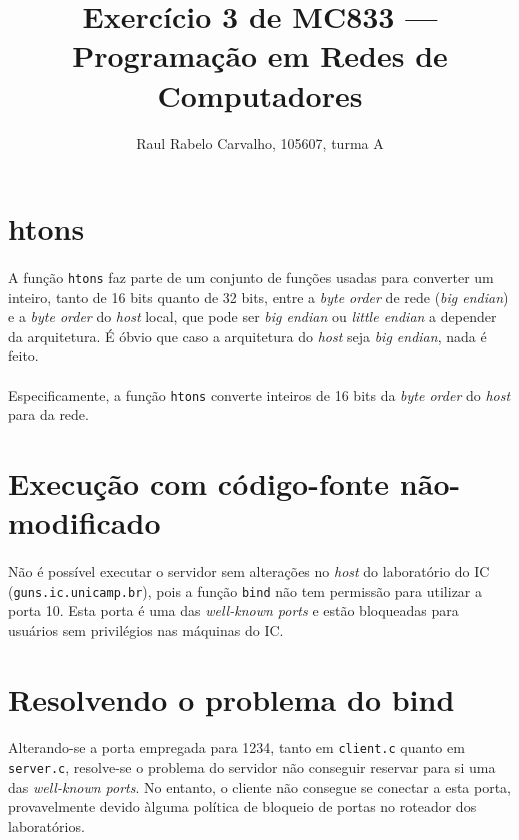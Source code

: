 \documentclass[a4paper,10pt,oneside,final,titlepage,onecolumn]{article}
\title{Exercício 3 de MC833 --- Programação em Redes de Computadores}
\author{Raul Rabelo Carvalho, 105607, turma A}
\begin{document}
\maketitle



\section{htons}
\paragraph{}A função \verb|htons| faz parte de um conjunto de funções usadas para converter um inteiro, tanto de 16 bits quanto de 32 bits, entre a \emph{byte order} de rede (\emph{big endian}) e a \emph{byte order} do \emph{host} local, que pode ser \emph{big endian} ou \emph{little endian} a depender da arquitetura. É óbvio que caso a arquitetura do \emph{host} seja \emph{big endian}, nada é feito.
\paragraph{}Especificamente, a função \verb|htons| converte inteiros de 16 bits da \emph{byte order} do \emph{host} para da rede.



\FloatBarrier
\section{Execução com código-fonte não-modificado}
\paragraph{}Não é possível executar o servidor sem alterações no \emph{host} do laboratório do IC (\verb|guns.ic.unicamp.br|), pois a função \verb|bind| não tem permissão para utilizar a porta 10. Esta porta é uma das \emph{well-known ports} e estão bloqueadas para usuários sem privilégios nas máquinas do IC.



\FloatBarrier
\section{Resolvendo o problema do bind}
\paragraph{}Alterando-se a porta empregada para 1234, tanto em \verb|client.c| quanto em \verb|server.c|, resolve-se o problema do servidor não conseguir reservar para si uma das \emph{well-known ports}. No entanto, o cliente não consegue se conectar a esta porta, provavelmente devido àlguma política de bloqueio de portas no roteador dos laboratórios.
\end{document}
